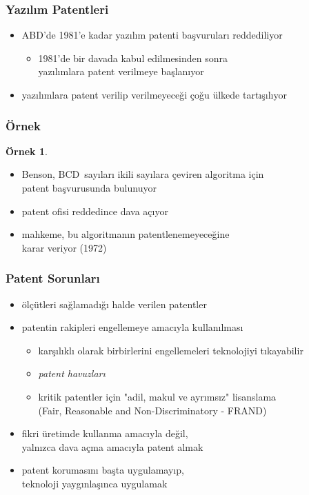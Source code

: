 \documentclass[dvipsnames]{beamer}
\theoremstyle{definition}
\theoremstyle{example}
\newtheorem{ornek}[theorem]{Örnek}
\theoremstyle{plain}
\begin{document}
\begin{frame}
  \frametitle{Yazılım Patentleri}

  \begin{itemize}
    \item ABD'de 1981'e kadar yazılım patenti başvuruları reddediliyor
    \begin{itemize}
      \item 1981'de bir davada kabul edilmesinden sonra\\
        yazılımlara patent verilmeye başlanıyor
    \end{itemize}

    \pause
    \medskip
    \item yazılımlara patent verilip verilmeyeceği çoğu ülkede tartışılıyor
  \end{itemize}
\end{frame}

\begin{frame}
  \frametitle{Örnek}

  \begin{ornek}
    \begin{itemize}
      \item Benson, BCD~sayıları ikili sayılara çeviren algoritma için\\
        patent başvurusunda bulunuyor
      \item patent ofisi reddedince dava açıyor
      \item mahkeme, bu algoritmanın patentlenemeyeceğine\\
        karar veriyor (1972)
    \end{itemize}
  \end{ornek}
\end{frame}

\begin{frame}
  \frametitle{Patent Sorunları}

  \begin{itemize}
    \item ölçütleri sağlamadığı halde verilen patentler

    \medskip
    \item patentin rakipleri engellemeye amacıyla kullanılması
    \begin{itemize}
      \item karşılıklı olarak birbirlerini engellemeleri teknolojiyi tıkayabilir
      \item \emph{patent havuzları}
      \item kritik patentler için "adil, makul ve ayrımsız" lisanslama\\
        (Fair, Reasonable and Non-Discriminatory - FRAND)
    \end{itemize}

    \medskip
    \item fikri üretimde kullanma amacıyla değil,\\
      yalnızca dava açma amacıyla patent almak

    \medskip
    \item patent korumasını başta uygulamayıp,\\
      teknoloji yaygınlaşınca uygulamak
  \end{itemize}
\end{frame}
\end{document}
